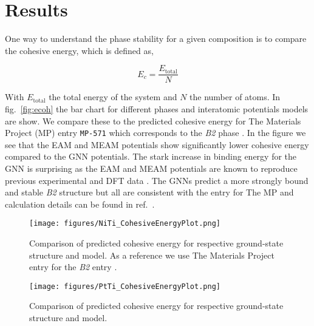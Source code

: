 \documentclass[preprint,colorlinks=true,linkcolor=black,citecolor=black]{elsarticle}
\begin{document}
\section{Results}
\label{sec:results}

One way to understand the phase stability for a given composition is to compare the cohesive energy, which is defined as,

\begin{equation}
  \label{eq:cohesive_energy}
  E_{c} = \frac{E_{\text{total}}}{N}
\end{equation}

With $E_{\text{total}}$ the total energy of the system and $N$ the number of atoms. In fig.~\ref{fig:ecoh} the bar chart for different phases and interatomic potentials models are show. We compare these to the predicted cohesive energy for The Materials Project (MP) entry \texttt{MP-571} which corresponds to the \textit{B2} phase \cite{MP--571}. In the figure we see that the EAM and MEAM potentials show significantly lower cohesive energy compared to the GNN potentials. The stark increase in binding energy for the GNN is surprising as the EAM and MEAM potentials are known to reproduce previous experimental and DFT data \cite{Haskins2016,Ko2015}. The GNNs predict a more strongly bound and stable \textit{B2} structure but all are consistent with the entry for The MP and calculation details can be found in ref.~\cite{MP--571}. \par

\begin{figure}[ht!]
    \begin{centering}
        \texttt{[image: figures/NiTi\_CohesiveEnergyPlot.png]}
        \caption{
          Comparison of predicted  cohesive energy for respective ground-state structure and model. As a reference we use The Materials Project entry for the  \textit{B2} entry \cite{MP--571}.
        }
        \label{fig:ecoh_niti}
    \end{centering}
\end{figure}


\begin{figure}[ht!]
    \begin{centering}
        \texttt{[image: figures/PtTi\_CohesiveEnergyPlot.png]}
        \caption{
          Comparison of predicted  cohesive energy for respective ground-state structure and model.
        }
        \label{fig:ecoh_ptti}
    \end{centering}
\end{figure}
\end{document}
